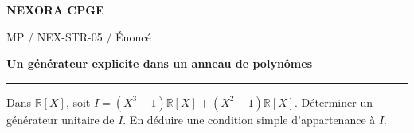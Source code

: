 \documentclass[11pt,a4paper]{article}
\begin{document}
{\small\bfseries\color{nexorablue} NEXORA CPGE}\par
{\small MP / NEX-STR-05 / Énoncé}\par
{\LARGE\bfseries Un générateur explicite dans un anneau de polynômes}\par
\vspace{0.25em}\hrule\vspace{0.6em}

Dans $\mathbb R[X]$, soit $I=(X^3-1)\mathbb R[X]+(X^2-1)\mathbb R[X]$. Déterminer un générateur unitaire de $I$. En déduire une condition simple d’appartenance à $I$.
\end{document}

